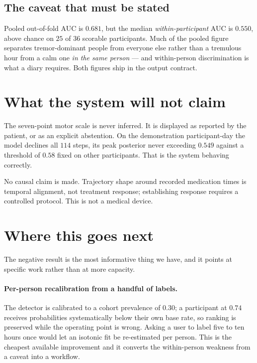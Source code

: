 \documentclass[11pt,a4paper]{article}
\begin{document}
\subsection{The caveat that must be stated}

Pooled out-of-fold AUC is $0.681$, but the median \emph{within-participant} AUC
is $0.550$, above chance on $25$ of $36$ scorable participants. Much of the
pooled figure separates tremor-dominant people from everyone else rather than a
tremulous hour from a calm one \emph{in the same person} --- and within-person
discrimination is what a diary requires. Both figures ship in the output
contract.

\section{What the system will not claim}

The seven-point motor scale is never inferred. It is displayed as reported by
the patient, or as an explicit abstention. On the demonstration
participant-day the model declines all $114$ steps, its peak posterior never
exceeding $0.549$ against a threshold of $0.58$ fixed on other participants.
That is the system behaving correctly.

No causal claim is made. Trajectory shape around recorded medication times is
temporal alignment, not treatment response; establishing response requires a
controlled protocol. This is not a medical device.

\section{Where this goes next}

The negative result is the most informative thing we have, and it points at
specific work rather than at more capacity.

\paragraph{Per-person recalibration from a handful of labels.}
The detector is calibrated to a cohort prevalence of $0.30$; a participant at
$0.74$ receives probabilities systematically below their own base rate, so
ranking is preserved while the operating point is wrong. Asking a user to label
five to ten hours once would let an isotonic fit be re-estimated per person.
This is the cheapest available improvement and it converts the within-person
weakness from a caveat into a workflow.
\end{document}
